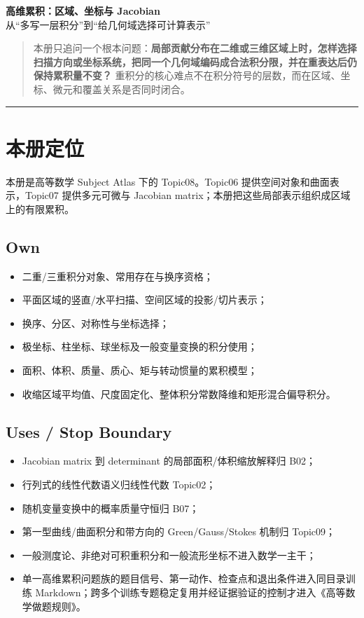 \documentclass[11pt,a4paper,fontset=fandol]{ctexart}
\begin{document}
\begin{center}
{\LARGE\textbf{高维累积：区域、坐标与 Jacobian}}\\[0.4em]
{\large 从“多写一层积分”到“给几何域选择可计算表示”}
\end{center}
\vspace{0.5em}

\begin{quote}
本册只追问一个根本问题：\textbf{局部贡献分布在二维或三维区域上时，怎样选择扫描方向或坐标系统，把同一个几何域编码成合法积分限，并在重表达后仍保持累积量不变？} 重积分的核心难点不在积分符号的层数，而在区域、坐标、微元和覆盖关系是否同时闭合。
\end{quote}

\begin{center}\rule{0.5\linewidth}{0.5pt}\end{center}

\setcounter{section}{-1}
\section{本册定位}

本册是高等数学 Subject Atlas 下的 Topic08。Topic06 提供空间对象和曲面表示，Topic07 提供多元可微与 Jacobian matrix；本册把这些局部表示组织成区域上的有限累积。

\subsection{Own}
\begin{itemize}
  \item 二重/三重积分对象、常用存在与换序资格；
  \item 平面区域的竖直/水平扫描、空间区域的投影/切片表示；
  \item 换序、分区、对称性与坐标选择；
  \item 极坐标、柱坐标、球坐标及一般变量变换的积分使用；
  \item 面积、体积、质量、质心、矩与转动惯量的累积模型；
  \item 收缩区域平均值、尺度固定化、整体积分常数降维和矩形混合偏导积分。
\end{itemize}

\subsection{Uses / Stop Boundary}
\begin{itemize}
  \item Jacobian matrix 到 determinant 的局部面积/体积缩放解释归 B02；
  \item 行列式的线性代数语义归线性代数 Topic02；
  \item 随机变量变换中的概率质量守恒归 B07；
  \item 第一型曲线/曲面积分和带方向的 Green/Gauss/Stokes 机制归 Topic09；
  \item 一般测度论、非绝对可积重积分和一般流形坐标不进入数学一主干；
  \item 单一高维累积问题族的题目信号、第一动作、检查点和退出条件进入同目录训练 Markdown；跨多个训练专题稳定复用并经证据验证的控制才进入《高等数学做题规则》。
\end{itemize}
\end{document}
